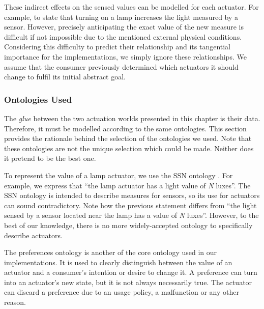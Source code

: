 These indirect effects on the sensed values can be modelled for each actuator.
For example, to state that turning on a lamp increases the light measured by a sensor.
However, precisely anticipating the exact value of the new measure is difficult if not impossible due to the mentioned external physical conditions.
Considering this difficulty to predict their relationship and its tangential importance for the implementations, we simply ignore these relationships.
We assume that the consumer previously determined which actuators it should change to fulfil its initial abstract goal.


\subsubsection{Ontologies Used}

The \emph{glue} between the two actuation worlds presented in this chapter is their data. %
Therefore, it must be modelled according to the same ontologies.
This section provides the rationale behind the selection of the ontologies we used.
Note that these ontologies are not the unique selection which could be made.
Neither does it pretend to be the best one.


To represent the value of a lamp actuator, we use the SSN ontology .
For example, we express that ``the lamp actuator has a light value of \emph{N} luxes''.
The SSN ontology is intended to describe measures for sensors, so its use for actuators can sound contradictory.
Note how the previous statement differs from ``the light sensed by a sensor located near the lamp has a value of \emph{N} luxes''.
However, to the best of our knowledge, there is no more widely-accepted ontology to specifically describe actuators.


The preferences ontology is another of the core ontology used in our implementations.
It is used to clearly distinguish between the value of an actuator and a consumer's intention or desire to change it.
A preference can turn into an actuator's new state, but it is not always necessarily true.
The actuator can discard a preference due to an usage policy, a malfunction or any other reason.

